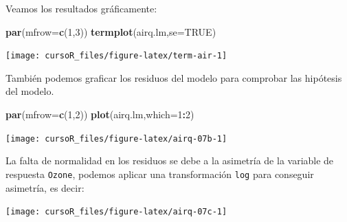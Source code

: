 \documentclass[]{book}
\newenvironment{Shaded}{\begin{snugshade}}{\end{snugshade}}
\newcommand{\KeywordTok}[1]{\textcolor[rgb]{0.13,0.29,0.53}{\textbf{#1}}}
\newcommand{\DataTypeTok}[1]{\textcolor[rgb]{0.13,0.29,0.53}{#1}}
\newcommand{\DecValTok}[1]{\textcolor[rgb]{0.00,0.00,0.81}{#1}}
\newcommand{\StringTok}[1]{\textcolor[rgb]{0.31,0.60,0.02}{#1}}
\newcommand{\OtherTok}[1]{\textcolor[rgb]{0.56,0.35,0.01}{#1}}
\newcommand{\OperatorTok}[1]{\textcolor[rgb]{0.81,0.36,0.00}{\textbf{#1}}}
\newcommand{\NormalTok}[1]{#1}
\begin{document}
Veamos los resultados gráficamente:

\begin{Shaded}
\begin{Highlighting}[]
\KeywordTok{par}\NormalTok{(}\DataTypeTok{mfrow=}\KeywordTok{c}\NormalTok{(}\DecValTok{1}\NormalTok{,}\DecValTok{3}\NormalTok{))}
\KeywordTok{termplot}\NormalTok{(airq.lm,}\DataTypeTok{se=}\OtherTok{TRUE}\NormalTok{)}
\end{Highlighting}
\end{Shaded}

\begin{center}\texttt{[image: cursoR\_files/figure-latex/term-air-1]} \end{center}

También podemos graficar los residuos del modelo para comprobar las
hipótesis del modelo.

\begin{Shaded}
\begin{Highlighting}[]
\KeywordTok{par}\NormalTok{(}\DataTypeTok{mfrow=}\KeywordTok{c}\NormalTok{(}\DecValTok{1}\NormalTok{,}\DecValTok{2}\NormalTok{))}
\KeywordTok{plot}\NormalTok{(airq.lm,}\DataTypeTok{which=}\DecValTok{1}\OperatorTok{:}\DecValTok{2}\NormalTok{)}
\end{Highlighting}
\end{Shaded}

\begin{center}\texttt{[image: cursoR\_files/figure-latex/airq-07b-1]} \end{center}

La falta de normalidad en los residuos se debe a la asimetría de la
variable de respuesta \texttt{Ozone}, podemos aplicar una transformación
\texttt{log} para conseguir asimetría, es decir:

\begin{Shaded}
\end{Shaded}

\begin{center}\texttt{[image: cursoR\_files/figure-latex/airq-07c-1]} \end{center}
\end{document}
